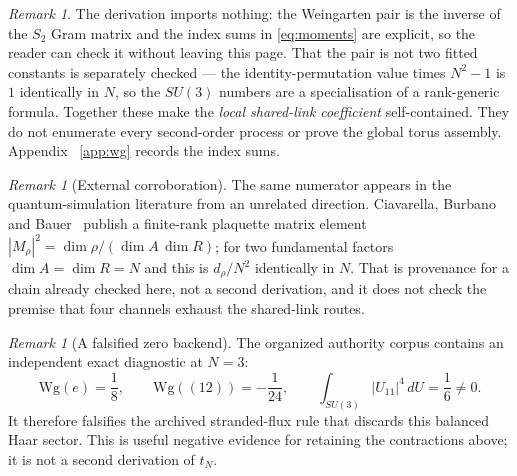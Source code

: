 \documentclass[11pt]{article}
\theoremstyle{plain}
\theoremstyle{definition}
\theoremstyle{remark}
\newtheorem{remark}[theorem]{Remark}
\newcommand{\chk}[1]{}
\begin{document}
\begin{remark}
The derivation imports nothing: the Weingarten pair is the inverse of the
$S_2$ Gram matrix and the index sums in \eqref{eq:moments} are explicit, so
the reader can check it without leaving this page. That the pair is not two
fitted constants is separately checked --- the identity-permutation value times
$N^2-1$ is $1$ identically in $N$, so the $SU(3)$ numbers are a specialisation
of a rank-generic formula. Together these make the \emph{local shared-link
coefficient} self-contained. They do not enumerate every second-order process
or prove the global torus assembly. Appendix~%
\ref{app:wg} records the index sums.
\chk{the Weingarten route is independent of the corpus}
\end{remark}

\begin{remark}[External corroboration]
The same numerator appears in the quantum-simulation literature from an
unrelated direction. Ciavarella, Burbano and Bauer~\cite{CBB2025} publish a
finite-rank plaquette matrix element
$|M_\rho|^2=\dim\rho/(\dim A\,\dim R)$; for two fundamental factors
$\dim A=\dim R=N$ and this is $d_\rho/N^2$ identically in $N$. That is
provenance for a chain already checked here, not a second derivation, and it
does not check the premise that four channels exhaust the shared-link routes.
\chk{the published dimension-ratio matrix element is this registry's weight formula}
\end{remark}

\begin{remark}[A falsified zero backend]
The organized authority corpus contains an independent exact diagnostic at
$N=3$:
\[
 \mathrm{Wg}(e)=\frac18,\qquad
 \mathrm{Wg}((12))=-\frac1{24},\qquad
 \int_{SU(3)}|U_{11}|^4\,dU=\frac16\ne0.
\]
It therefore falsifies the archived stranded-flux rule that discards this
balanced Haar sector. This is useful negative evidence for retaining the
contractions above; it is not a second derivation of $t_N$.
\end{remark}
\end{document}
